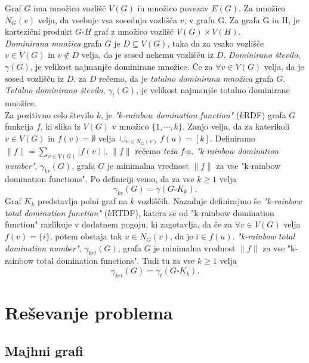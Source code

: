 \documentclass[a4paper]{article}
\begin{document}
Graf $G$ ima množico vozlišč $V(G)$ in množico povezav $E(G)$. Za množico $N_G(v)$ velja, da vsebuje vsa sosednja vozlišča $v$, v grafu G. Za grafa G in H, je kartezični produkt $G \square H$ graf z množico vozlišč $V(G) \times V(H)$.\\
\textit{Dominirana množica} grafa $G$ je $D \subseteq V(G)$, taka da za vsako vozlišče $v \in V(G)$ in $v \notin D$ velja, da je sosed nekemu vozlišču iz $D$. \textit{Dominirano število}, $\gamma(G)$, je velikost najmanjše dominirane množice. Če za $\forall v \in V(G)$ velja, da je sosed vozlišču iz $D$, za $D$ rečemo, da je \textit{totalno dominirana množica} grafa $G$. \textit{Totalno dominirano število}, $\gamma_{t}(G)$, je velikost najmanjše totalno dominirane množice.\\
Za pozitivno celo število $k$, je \textit{"k-rainbow domination function"} ($k$RDF) grafa $G$ funkcija $f$, ki slika iz $V(G)$ v množico $\{1, \cdots, k\}$. Zanjo velja, da za katerikoli $v \in V(G)$ in $f(v) = \emptyset$ velja $\cup_{u \in N_G(v)} f(u) = [k]$. Definiramo $\|f\| = \sum_{v \in V(G)}|f(v)|$. $\|f\|$ rečemo \textit{teža} $f$-a. \textit{"k-rainbow domination number"}, $\gamma_{kr}(G)$, grafa $G$ je minimalna vrednost $\|f\|$ za vse "k-rainbow domination functions". Po definiciji vemo, da za vse $k \geq 1$ velja $$\gamma_{kr}(G) = \gamma(G \square K_k).$$
Graf $K_k$ predstavlja polni graf na $k$ vozliščih. Nazadnje definirajmo še \textit{"k-rainbow total domination function"} ($k$RTDF), katera se od "k-rainbow domination function" razlikuje v dodatnem pogoju, ki zagotavlja, da če za $\forall v \in V(G)$ velja $f(v) = \{i\}$, potem obstaja tak $u \in N_G(v)$, da je $i \in f(u)$. \textit{"k-rainbow total domination number"}, $\gamma_{krt}(G)$, grafa $G$ je minimalna vrednost $\|f\|$ za vse "k-rainbow total domination functions". Tudi tu za vse $k \geq 1$ velja $$\gamma_{krt}(G) = \gamma_t(G \square K_k).$$
\pagebreak

\section{Reševanje problema}

\subsection{Majhni grafi}
\end{document}
